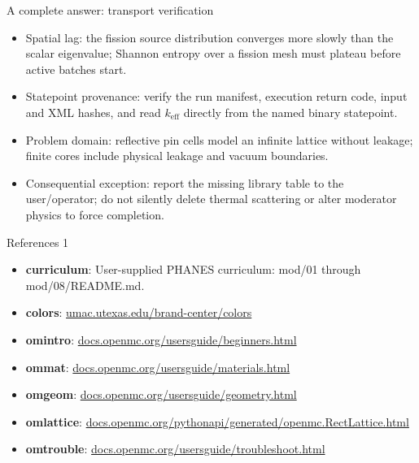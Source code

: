 \documentclass[aspectratio=169,11pt]{beamer}
\begin{document}
\begin{frame}[t,fragile]{A complete answer: transport verification}
\fontsize{11.5}{14}\selectfont
\begin{itemize}\setlength{\itemsep}{2mm}
\item Spatial lag: the fission source distribution converges more slowly than the scalar eigenvalue; Shannon entropy over a fission mesh must plateau before active batches start.
\item Statepoint provenance: verify the run manifest, execution return code, input and XML hashes, and read $k_{\mathrm{eff}}$ directly from the named binary statepoint.
\item Problem domain: reflective pin cells model an infinite lattice without leakage; finite cores include physical leakage and vacuum boundaries.
\item Consequential exception: report the missing library table to the user/operator; do not silently delete thermal scattering or alter moderator physics to force completion.
\end{itemize}
\end{frame}
\begin{frame}[t]{References 1}
\fontsize{9}{12}\selectfont\begin{itemize}\setlength{\itemsep}{3mm}
\item \textbf{curriculum}: User-supplied PHANES curriculum: mod/01 through mod/08/README.md.
\item \textbf{colors}: \href{https://umac.utexas.edu/brand-center/colors/}{umac.utexas.edu/brand-center/colors}
\item \textbf{omintro}: \href{https://docs.openmc.org/en/stable/usersguide/beginners.html}{docs.openmc.org/usersguide/beginners.html}
\item \textbf{ommat}: \href{https://docs.openmc.org/en/stable/usersguide/materials.html}{docs.openmc.org/usersguide/materials.html}
\item \textbf{omgeom}: \href{https://docs.openmc.org/en/stable/usersguide/geometry.html}{docs.openmc.org/usersguide/geometry.html}
\item \textbf{omlattice}: \href{https://docs.openmc.org/en/stable/pythonapi/generated/openmc.RectLattice.html}{docs.openmc.org/pythonapi/generated/openmc.RectLattice.html}
\item \textbf{omtrouble}: \href{https://docs.openmc.org/en/stable/usersguide/troubleshoot.html}{docs.openmc.org/usersguide/troubleshoot.html}
\end{itemize}\end{frame}
\end{document}
